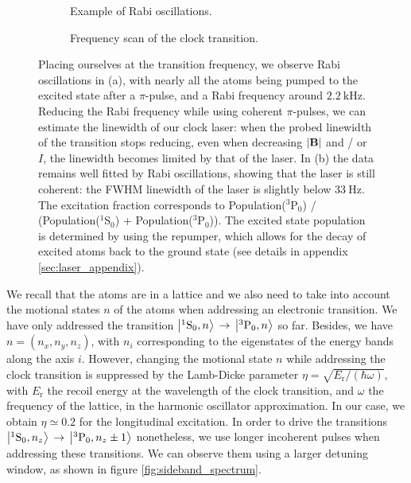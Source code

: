 \documentclass[11pt]{article}
\numberwithin{equation}{section}
\numberwithin{figure}{section}
\begin{document}
%
\begin{figure}[htbp]
	\centering
	\begin{subfigure}[b]{0.48\textwidth}
		\centering
		\small
   		
		\caption{\small Example of Rabi oscillations.}
		\label{fig:clock_rabi}
	\end{subfigure}
	\hspace{0.4cm}
	\begin{subfigure}[b]{0.48\textwidth}
    	\centering
    	\small
   		
		\caption{\small Frequency scan of the clock transition.}
		\label{fig:clock_line}
	\end{subfigure}	
	\caption{\small Placing ourselves at the transition frequency, we observe Rabi oscillations in (a), with nearly all the atoms being pumped to the excited state after a $\pi$-pulse, and a Rabi frequency around $\SI{2.2}{\kilo\hertz}$. Reducing the Rabi frequency while using coherent $\pi$-pulses, we can estimate the linewidth of our clock laser: when the probed linewidth of the transition stops reducing, even when decreasing $\abs{\mathbf{B}}$ and / or $I$, the linewidth becomes limited by that of the laser. In (b) the data remains well fitted by Rabi oscillations, showing that the laser is still coherent: the FWHM linewidth of the laser is slightly below $\SI{33}{\hertz}$. The excitation fraction corresponds to Population($^3$P$_0$) / (Population($^1$S$_0$) + Population($^3$P$_0$)). The excited state population is determined by using the repumper, which allows for the decay of excited atoms back to the ground state (see details in appendix \ref{sec:laser_appendix}).}
    \label{fig:clock}
\end{figure}
%

We recall that the atoms are in a lattice and we also need to take into account the motional states $n$ of the atoms when addressing an electronic transition. We have only addressed the transition $\ket{^1\text{S}_0, n} \, \rightarrow \, \ket{^3\text{P}_0, n}$ so far. Besides, we have $n = (n_x, n_y, n_z)$, with $n_i$ corresponding to the eigenstates of the energy bands along the axis $i$. However, changing the motional state $n$ while addressing the clock transition is suppressed by the Lamb-Dicke parameter $\eta = \sqrt{E_\text{r}/ (\hbar \omega)}$, with $E_\text{r}$ the recoil energy at the wavelength of the clock transition, and $\omega$ the frequency of the lattice, in the harmonic oscillator approximation. In our case, we obtain $\eta \simeq 0.2$ for the longitudinal excitation. In order to drive the transitions $\ket{^1\text{S}_0, n_z} \, \rightarrow \, \ket{^3\text{P}_0, n_z \pm 1}$ nonetheless, we use longer incoherent pulses when addressing these transitions. We can observe them using a larger detuning window, as shown in figure \ref{fig:sideband_spectrum}.
\end{document}
